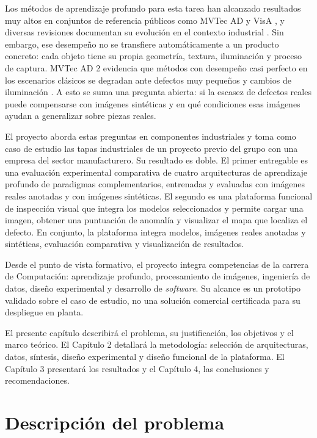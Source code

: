 \documentclass[12pt,oneside]{report}
\begin{document}
Los métodos de aprendizaje profundo para esta tarea han alcanzado resultados muy altos en conjuntos de referencia públicos como MVTec AD \cite{bergmann2019,bergmann2021} y VisA \cite{zou2022}, y diversas revisiones documentan su evolución en el contexto industrial \cite{liu2024}. Sin embargo, ese desempeño no se transfiere automáticamente a un producto concreto: cada objeto tiene su propia geometría, textura, iluminación y proceso de captura. MVTec AD 2 evidencia que métodos con desempeño casi perfecto en los escenarios clásicos se degradan ante defectos muy pequeños y cambios de iluminación \cite{heckler2026}. A esto se suma una pregunta abierta: si la escasez de defectos reales puede compensarse con imágenes sintéticas y en qué condiciones esas imágenes ayudan a generalizar sobre piezas reales.

El proyecto aborda estas preguntas en componentes industriales y toma como caso de estudio las tapas industriales de un proyecto previo del grupo con una empresa del sector manufacturero. Su resultado es doble. El primer entregable es una evaluación experimental comparativa de cuatro arquitecturas de aprendizaje profundo de paradigmas complementarios, entrenadas y evaluadas con imágenes reales anotadas y con imágenes sintéticas. El segundo es una plataforma funcional de inspección visual que integra los modelos seleccionados y permite cargar una imagen, obtener una puntuación de anomalía y visualizar el mapa que localiza el defecto. En conjunto, la plataforma integra modelos, imágenes reales anotadas y sintéticas, evaluación comparativa y visualización de resultados.

Desde el punto de vista formativo, el proyecto integra competencias de la carrera de Computación: aprendizaje profundo, procesamiento de imágenes, ingeniería de datos, diseño experimental y desarrollo de \textit{software}. Su alcance es un prototipo validado sobre el caso de estudio, no una solución comercial certificada para su despliegue en planta.

El presente capítulo describirá el problema, su justificación, los objetivos y el marco teórico. El Capítulo 2 detallará la metodología: selección de arquitecturas, datos, síntesis, diseño experimental y diseño funcional de la plataforma. El Capítulo 3 presentará los resultados y el Capítulo 4, las conclusiones y recomendaciones.

\section{Descripción del problema}
\end{document}
